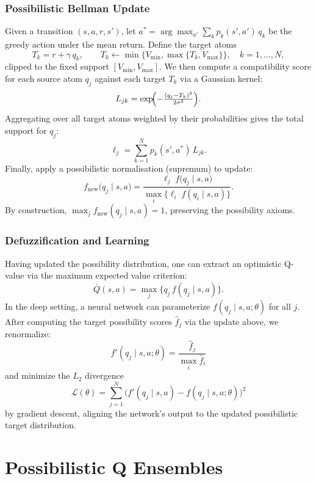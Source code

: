 \documentclass[12pt,a4paper]{report}
\begin{document}
\subsection*{Possibilistic Bellman Update}
Given a transition $(s,a,r,s')$, let $a^*=\arg\max_{a'}\sum_{k} p_k(s',a')\,q_k$ be the greedy action under the mean return.  Define the target atoms
\[
  T_k = r + \gamma\,q_k, \qquad
  T_k \leftarrow \min\{V_{\min}, \max\{T_k, V_{\max}\}\},
  \quad k=1,\dots,N,
\]
clipped to the fixed support $[V_{\min},V_{\max}]$.  We then compute a compatibility score for each source atom $q_j$ against each target $T_k$ via a Gaussian kernel:
\[
  L_{jk} = \exp\!\Bigl(-\tfrac{(q_j - T_k)^2}{2\sigma^2}\Bigr).
\]
Aggregating over all target atoms weighted by their probabilities gives the total support for $q_j$:
\[
  \ell_j = \sum_{k=1}^N p_k(s',a^*)\,L_{jk}.
\]
Finally, apply a possibilistic normalisation (supremum) to update:
\[
  f_{\text{new}}\bigl(q_j \mid s,a\bigr)
  = \frac{\ell_j \; f\bigl(q_j \mid s,a\bigr)}{\max_{i}\{\ell_i \; f(q_i\mid s,a)\}}.
\]
By construction, $\max_j f_{\text{new}}(q_j\mid s,a)=1$, preserving the possibility axioms.

\subsection*{Defuzzification and Learning}
Having updated the possibility distribution, one can extract an optimistic Q-value via the maximum expected value criterion:
\[
  \bar Q(s,a) = \max_{j}\bigl\{q_j\,f(q_j\mid s,a)\bigr\}.
\]
In the deep setting, a neural network can parameterize $f(q_j\mid s,a;\theta)$ for all $j$.  After computing the target possibility scores $\hat f_j$ via the update above, we renormalize:
\[
  f'(q_j\mid s,a;\theta) = \frac{\hat f_j}{\max_i \hat f_i}
\]
and minimize the $L_2$ divergence
\[
  \mathcal L(\theta) = \sum_{j=1}^{N}\bigl(f'(q_j\mid s,a) - f(q_j\mid s,a;\theta)\bigr)^2
\]
by gradient descent, aligning the network’s output to the updated possibilistic target distribution.

\chapter{Possibilistic Q Ensembles}
\end{document}
